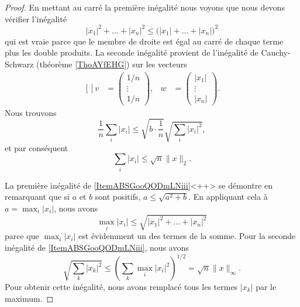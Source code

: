 \begin{proof}
    En mettant au carré la première inégalité nous voyons que nous devons vérifier l'inégalité
    \begin{equation}
        | x_1 |^2+\ldots+| x_n |^2\leq\big( | x_1 |+\ldots+| x_n | \big)^2
    \end{equation}
    qui est vraie parce que le membre de droite est égal au carré de chaque terme plus les double produits. La seconde inégalité provient de l'inégalité de Cauchy-Schwarz (théorème \ref{ThoAYfEHG}) sur les vecteurs
    \begin{equation}
        \begin{aligned}[]
            v&=\begin{pmatrix}
                1/n    \\ 
                \vdots    \\ 
                1/n    
            \end{pmatrix},
            &w&=\begin{pmatrix}
                | x_1 |    \\ 
                \vdots    \\ 
                | x_n |    
            \end{pmatrix}.
        \end{aligned}
    \end{equation}
    Nous trouvons 
    \begin{equation}
        \frac{1}{ n }\sum_i| x_i |\leq\sqrt{b\cdot\frac{1}{ n }}\sqrt{\sum_i| x_i |^2},
    \end{equation}
    et par conséquent
    \begin{equation}
        \sum_i| x_i |\leq\sqrt{n}\| x \|_2.
    \end{equation}
    
    La première inégalité de \ref{ItemABSGooQODmLNiii}<++> se démontre en remarquant que si \( a\) et \( b\) sont positifs, \( a\leq\sqrt{a^2+b}\). En appliquant cela à \( a=\max_i| x_i |\), nous avons
    \begin{equation}
        \max_i| x_i |\leq\sqrt{ | x_1 |^2+\ldots+| x_n |^2  }
    \end{equation}
    parce que \( \max_i| x_i |\) est évidemment un des termes de la somme. Pour la seconde inégalité de \ref{ItemABSGooQODmLNiii}, nous avons
    \begin{equation}
        \sqrt{\sum_k| x_k |^2}\leq\left( \sum_k\max_i| x_i |^2 \right)^{1/2}=\sqrt{n}\| x \|_{\infty}.
    \end{equation}
    Pour obtenir cette inégalité, nous avons remplacé tous les termes \( | x_k |\) par le maximum.
\end{proof}

